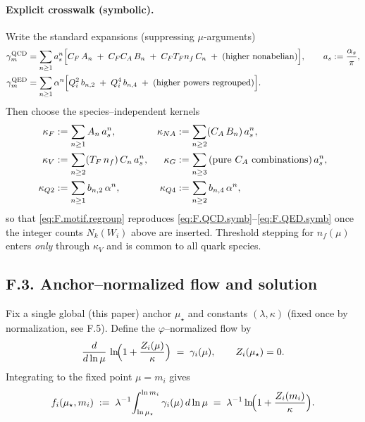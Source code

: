 \documentclass[epjc3]{svjour3}
\begin{document}
\paragraph{Explicit crosswalk (symbolic).}
Write the standard expansions (suppressing $\mu$-arguments)
\begin{align}
  \gamma^{\mathrm{QCD}}_m
  &=\sum_{n\ge1} a_s^n
    \Bigl[
      C_F\,A_n\;+\;C_FC_A\,B_n\;+\;C_FT_Fn_f\,C_n\;+\;\text{(higher nonabelian)}
    \Bigr],\qquad a_s:=\frac{\alpha_s}{\pi},\label{eq:F.QCD.symb}\\
  \gamma^{\mathrm{QED}}_m
  &=\sum_{n\ge1}\alpha^n
    \Bigl[
      Q_i^2\,b_{n,2}\;+\;Q_i^4\,b_{n,4}\;+\;\text{(higher powers regrouped)}
    \Bigr].\label{eq:F.QED.symb}
\end{align}
Then choose the species--independent kernels
\begin{align}
  \kappa_F    &:= \sum_{n\ge1} A_n\,a_s^n,           &
  \kappa_{NA} &:= \sum_{n\ge2} (C_A\,B_n)\,a_s^n,\notag\\
  \kappa_V    &:= \sum_{n\ge2} (T_F\,n_f)\,C_n\,a_s^n,&
  \kappa_G    &:= \sum_{n\ge3} \text{(pure $C_A$ combinations)}\,a_s^n,\notag\\
  \kappa_{Q2} &:= \sum_{n\ge1} b_{n,2}\,\alpha^n,     &
  \kappa_{Q4} &:= \sum_{n\ge2} b_{n,4}\,\alpha^n,\label{eq:F.kappa.def}
\end{align}
so that \eqref{eq:F.motif.regroup} reproduces \eqref{eq:F.QCD.symb}–\eqref{eq:F.QED.symb} once the integer counts $N_k(W_i)$ above are inserted.  Threshold stepping for $n_f(\mu)$ enters \emph{only} through $\kappa_V$ and is common to all quark species.


\subsection*{F.3. Anchor--normalized flow and solution}
Fix a single global (this paper) anchor $\mu_\star$ and constants $(\lambda,\kappa)$ (fixed once by normalization, see F.5).  Define the $\varphi$--normalized flow by
\begin{equation}
  \frac{d}{d\ln\mu}\,\ln\!\Bigl(1+\frac{Z_i(\mu)}{\kappa}\Bigr)
  \;=\;\gamma_i(\mu),\qquad Z_i(\mu_\star)=0.
  \label{eq:F.flow.ode}
\end{equation}
Integrating to the fixed point $\mu=m_i$ gives
\begin{equation}
  f_i(\mu_\star,m_i)\;:=\;\lambda^{-1}\!\int_{\ln\mu_\star}^{\ln m_i}\gamma_i(\mu)\,d\ln\mu
  \;=\;\lambda^{-1}\ln\!\Bigl(1+\frac{Z_i(m_i)}{\kappa}\Bigr).
  \label{eq:F.flow.solution}
\end{equation}
\end{document}
